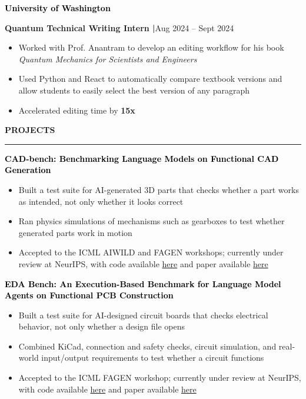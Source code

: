\documentclass[8pt,a4paper]{altacv}
\newcommand{\resumebodysize}{\fontsize{8pt}{9pt}\selectfont}
\renewcommand{\divider}{\textcolor{body!30}{\hdashrule{\linewidth}{0.6pt}{0.285em}}\vspace{2.5pt}}
\newcommand{\projectdivider}{\vskip-1.937pt\divider}
\renewcommand{\cvsection}[2][]{%
  \bigskip%
  \vspace{3.686pt}%
  \ifstrequal{#1}{}{}{\marginpar{\vspace*{\dimexpr1pt-\baselineskip}\raggedright}}%
  {\color{heading}\large\bfseries\MakeUppercase{#2}}\\[-1ex]\vspace{1.489pt}%
  {\color{heading}\rule{\linewidth}{2pt}\par}\medskip\vspace{1.179pt}
}
\renewcommand{\cvevent}[4]{%
  {\fontsize{9pt}{9pt}\selectfont\color{black}\hspace*{-0.282pt}#1\par}
  \ifstrequal{#2}{}{}{%
    \vspace{2.144pt}
    {\fontsize{9pt}{9pt}\selectfont\textbf{\color{accent}#2}\hspace{0.5em}\resumebodysize\faCalendar\hspace{0.5em}#3\par}%
  }%
  \vspace{2.145pt}\resumebodysize
}
\begin{document}
\cvevent{\textcolor{black}{\textbf{University of Washington}}}{\textnormal{Quantum Technical Writing Intern |}}{Aug 2024 – Sept 2024}{}
\begin{itemize}
\item Worked with Prof. Anantram to develop an editing workflow for his book \textit{Quantum Mechanics for Scientists and Engineers}
\item Used Python and React to automatically compare textbook versions and allow students to easily select the best version of any paragraph
\item Accelerated editing time by \textbf{15x}
\end{itemize}

\vskip-4.265pt
\cvsection{Projects}
\vskip-1.479pt

\cvevent{\textcolor{black}{\textbf{CAD-bench: Benchmarking Language Models on Functional CAD Generation}}}{}{}{}
\begin{itemize}
\item Built a test suite for AI-generated 3D parts that checks whether a part works as intended, not only whether it looks correct
\item Ran physics simulations of mechanisms such as gearboxes to test whether generated parts work in motion
\item Accepted to the ICML AIWILD and FAGEN workshops; currently under review at NeurIPS, with code available \href{https://github.com/cad-bench/cad-bench}{here} and paper available \href{https://github.com/CAD-bench/cad-bench/blob/main/paper/main.pdf}{here}
\end{itemize}
\projectdivider

\cvevent{\textcolor{black}{\textbf{EDA Bench: An Execution-Based Benchmark for Language Model Agents on Functional PCB Construction}}}{}{}{}
\begin{itemize}
\item Built a test suite for AI-designed circuit boards that checks electrical behavior, not only whether a design file opens
\item Combined KiCad, connection and safety checks, circuit simulation, and real-world input/output requirements to test whether a circuit functions
\item Accepted to the ICML FAGEN workshop; currently under review at NeurIPS, with code available \href{https://github.com/eda-bench/eda-bench}{here} and paper available \href{https://github.com/eda-bench/eda-bench/blob/master/paper/main.pdf}{here}
\end{itemize}
\projectdivider
\end{document}
